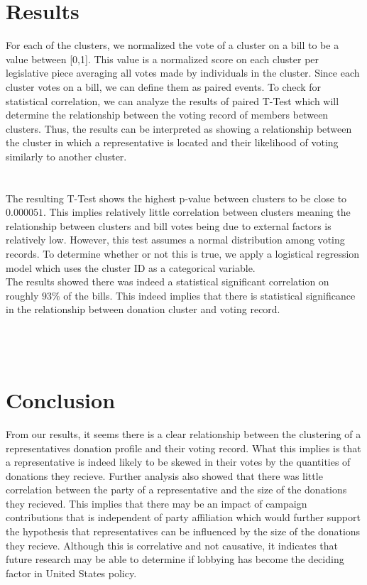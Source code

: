 \documentclass[journal]{IEEEtran}
\begin{document}
\section{Results}
For each of the clusters, we normalized the vote of a cluster on a bill to be a value between [0,1]. This value is a normalized score
on each cluster per legislative piece averaging all votes made by individuals in the cluster. Since each cluster votes on a bill, we 
can define them as paired events. To check for statistical correlation, we can analyze the results of paired T-Test which will 
determine the relationship between the voting record of members between clusters. Thus, the results can be interpreted as showing a 
relationship between the cluster in which a representative is located and their likelihood of voting similarly to another cluster.\\
\\\\
The resulting T-Test shows the highest p-value between clusters to be close to $0.000051$. This implies relatively little correlation between
clusters meaning the relationship between clusters and bill votes being due to external factors is relatively low. However, this test 
assumes a normal distribution among voting records. To determine whether or not this is true, we apply a logistical regression model which
uses the cluster ID as a categorical variable.\\
The results showed there was indeed a statistical significant correlation on roughly $93\%$ of the bills. This indeed implies that there is 
statistical significance in the relationship between donation cluster and voting record.\\\\
\\\\
\section{Conclusion}
From our results, it seems there is a clear relationship between the clustering of a representatives donation profile and their voting
record. What this implies is that a representative is indeed likely to be skewed in their votes by the quantities of donations they recieve.
Further analysis also showed that there was little correlation between the party of a representative and the size of the donations they
recieved. This implies that there may be an impact of campaign contributions that is independent of party affiliation which would further
support the hypothesis that representatives can be influenced by the size of the donations they recieve. Although this is correlative and
not causative, it indicates that future research may be able to determine if lobbying has become the deciding factor in United States policy.
\end{document}
